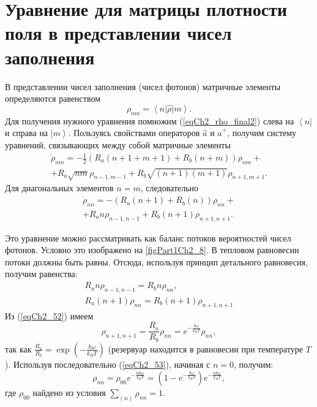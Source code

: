 \section{Уравнение для матрицы плотности поля в представлении чисел
  заполнения}
\label{ch2_7}
В представлении чисел заполнения (чисел фотонов) матричные элементы
определяются равенством
\[
\rho_{nm} = \left<n\right|\hat{\rho}\left|m\right>.
\]
Для получения нужного уравнения помножим
(\ref{eqCh2_rho_final2}) слева на $\left<n\right|$ и справа на  
$\left|m\right>$.  Пользуясь
свойствами операторов $\hat{a}$ и $\hat{a}^{+}$,  получим систему
уравнений, связывающих между собой матричные элементы 
\begin{eqnarray}
\dot{\rho}_{nm} = - \frac{1}{2}
\left(
R_a\left(n + 1 + m + 1\right) + 
R_b\left(n + m\right)
\right)\rho_{nm} +
\nonumber \\
+ 
R_a\sqrt{nm}\rho_{n - 1, m - 1} +
R_b\sqrt{\left(n + 1\right)\left(m + 1\right)}\rho_{n + 1, m + 1}.
\label{eqCh2_task5}
\end{eqnarray}
Для диагональных элементов $n = m$,  следовательно
\begin{eqnarray}
\dot{\rho}_{nn} = - 
\left(
R_a\left(n + 1\right) + 
R_b\left(n\right)
\right)\rho_{nn} +
\nonumber \\
+ 
R_a n \rho_{n - 1, n - 1} +
R_b\left(n + 1\right)\rho_{n + 1, n + 1}.
\label{eqCh2_51}
\end{eqnarray}



Это уравнение можно рассматривать как баланс потоков вероятностей
чисел фотонов. Условно это изображено на \autoref{figPart1Ch2_8}. В
тепловом равновесии потоки должны быть равны. Отсюда, используя
принцип детального равновесия, получим равенства: 
\begin{eqnarray}
R_a n \rho_{n - 1, n - 1} = R_b n \rho_{nn},
\nonumber \\
R_a \left(n + 1\right) \rho_{n n} = R_b 
\left(n + 1\right) \rho_{n + 1, n + 1}
\label{eqCh2_52}
\end{eqnarray}
Из (\ref{eqCh2_52}) имеем
\begin{equation}
\rho_{n + 1, n + 1} = \frac{R_a}{R_b}\rho_{nn} = 
e^{-\frac{\hbar \omega}{k_B T}}\rho_{nn},
\label{eqCh2_53}
\end{equation}
так как  
\(
\frac{R_a}{R_b} = 
\exp \left(-\frac{\hbar \omega}{k_B T}\right)
\)
(резервуар находится в равновесии при температуре
$T$). Используя последовательно (\ref{eqCh2_53}), начиная с  $n = 0$, 
получим:  
\begin{equation}
\rho_{nn} = \rho_{00} 
e^{-\frac{n \hbar \omega}{k_B T}} =
\left(1 - e^{-\frac{\hbar \omega}{k_B T}}\right) 
e^{-\frac{n \hbar \omega}{k_B T}},
\end{equation}
где $\rho_{00}$ найдено из условия $\sum_{(n)}\rho_{nn} = 1$.

